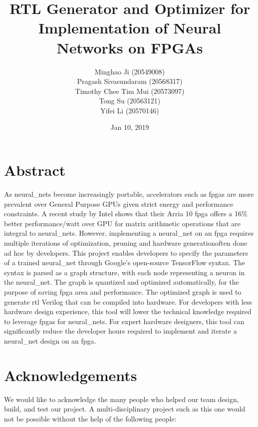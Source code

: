\documentclass{uw-ece-wkrpt}
\title{RTL Generator and Optimizer for Implementation of Neural Networks on FPGAs}
\author{Minghao Ji (20549008)\\
        Pragash Sivasundaram (20568317)\\
        Timothy Chee Tim Mui (20573097)\\
        Tong Su (20563121)\\
        Yifei Li (20570146)}
\date{Jan 10, 2019}
\begin{document}
\maketitle

\frontmatter

\begin{onehalfspacing}

\section{Abstract}
As \glspl{neural_net} become increasingly portable, accelerators such as \glspl{fpga} are more prevalent over General Purpose GPUs given strict energy and performance constraints. A recent study by Intel shows that their Arria 10 \gls{fpga} offers a 16\% better performance/watt over GPU for matrix arithmetic operations that are integral to \glspl{neural_net}. However, implementing a \gls{neural_net} on an \gls{fpga} requires multiple iterations of optimization, pruning and hardware generation\textemdash{}often done ad hoc by developers. This project enables developers to specify the parameters of a trained \gls{neural_net} through Google's open-source TensorFlow syntax. The syntax is parsed as a graph structure, with each node representing a neuron in the \gls{neural_net}. The graph is quantized and optimized automatically, for the purpose of saving \gls{fpga} area and performance. The optimized graph is used to generate \gls{rtl} Verilog that can be compiled into hardware. For developers with less hardware design experience, this tool will lower the technical knowledge required to leverage \glspl{fpga} for \glspl{neural_net}. For expert hardware designers, this tool can significantly reduce the developer hours required to implement and iterate a \gls{neural_net} design on an \gls{fpga}.

\section{Acknowledgements}
We would like to acknowledge the many people who helped our team design, build, and test our project. A multi-disciplinary project such as this one would not be possible without the help of the following people:


\end{onehalfspacing}
\end{document}
